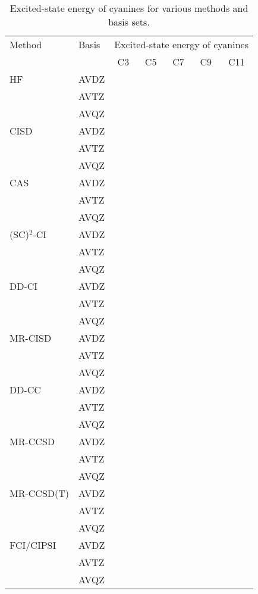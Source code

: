 \documentclass[aip,jcp,reprint,showkeys]{revtex4-1}
\newcommand{\mc}{\multicolumn}
\newcommand{\SCSC}{(SC)$^2$}
\begin{document}
\begin{table*}
	\caption{
	\label{tab:ES-energy}
	Excited-state energy of cyanines for various methods and basis sets.}
	\begin{ruledtabular}
	\begin{tabular}{llccccc}
		Method		&	Basis		&	\mc{5}{c}{Excited-state energy of cyanines}				\\
										\cline{3-7}
					&				&	C3		&	C5		&	C7		&	C9		&	C11		\\
					\hline
		HF			&	AVDZ		&			&			&			&			&			\\
					&	AVTZ		&			&			&			&			&			\\
					&	AVQZ		&			&			&			&			&			\\
					\hline
		CISD		&	AVDZ		&			&			&			&			&			\\
					&	AVTZ		&			&			&			&			&			\\
					&	AVQZ		&			&			&			&			&			\\
					\hline
		CAS			&	AVDZ		&			&			&			&			&			\\
					&	AVTZ		&			&			&			&			&			\\
					&	AVQZ		&			&			&			&			&			\\
					\hline
		\SCSC-CI	&	AVDZ		&			&			&			&			&			\\
					&	AVTZ		&			&			&			&			&			\\
					&	AVQZ		&			&			&			&			&			\\
					\hline
		DD-CI		&	AVDZ		&			&			&			&			&			\\
					&	AVTZ		&			&			&			&			&			\\
					&	AVQZ		&			&			&			&			&			\\
					\hline
		MR-CISD		&	AVDZ		&			&			&			&			&			\\
					&	AVTZ		&			&			&			&			&			\\
					&	AVQZ		&			&			&			&			&			\\
					\hline
		DD-CC		&	AVDZ		&			&			&			&			&			\\
					&	AVTZ		&			&			&			&			&			\\
					&	AVQZ		&			&			&			&			&			\\
					\hline
		MR-CCSD		&	AVDZ		&			&			&			&			&			\\
					&	AVTZ		&			&			&			&			&			\\
					&	AVQZ		&			&			&			&			&			\\
					\hline
		MR-CCSD(T)	&	AVDZ		&			&			&			&			&			\\
					&	AVTZ		&			&			&			&			&			\\
					&	AVQZ		&			&			&			&			&			\\
					\hline
		FCI/CIPSI	&	AVDZ		&			&			&			&			&			\\
					&	AVTZ		&			&			&			&			&			\\
					&	AVQZ		&			&			&			&			&			\\
	\end{tabular}		
	\end{ruledtabular}		
\end{table*}		
\end{document}
